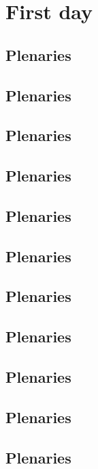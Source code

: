 


\tableofcontents
\clearpage
\section{First day}

\subsection{ Plenaries}

\clearpage
\subsection{ Plenaries}

\clearpage
\subsection{ Plenaries}

\clearpage
\subsection{ Plenaries}

\clearpage
\subsection{ Plenaries}

\clearpage
\subsection{ Plenaries}

\clearpage
\subsection{ Plenaries}

\clearpage
\subsection{ Plenaries}

\clearpage
\subsection{ Plenaries}

\clearpage
\subsection{ Plenaries}

\clearpage
\subsection{ Plenaries}

\clearpage
